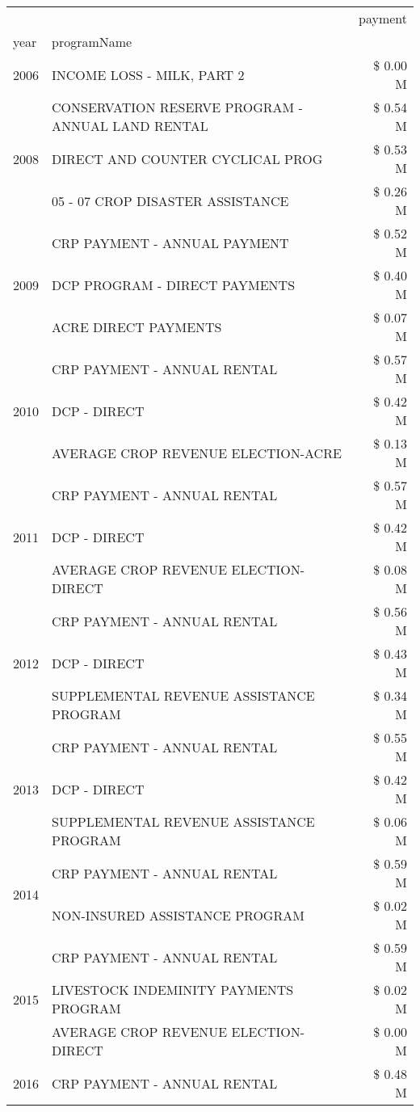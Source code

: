 \begin{tabular}{llr}
\toprule
 &  & payment \\
year & programName &  \\
\midrule
2006 & INCOME LOSS - MILK, PART 2 & \$ 0.00 M \\
\cline{1-3}
\multirow[t]{3}{*}{2008} & CONSERVATION RESERVE PROGRAM - ANNUAL LAND RENTAL & \$ 0.54 M \\
 & DIRECT AND COUNTER CYCLICAL PROG & \$ 0.53 M \\
 & 05 - 07 CROP DISASTER ASSISTANCE & \$ 0.26 M \\
\cline{1-3}
\multirow[t]{3}{*}{2009} & CRP PAYMENT - ANNUAL PAYMENT & \$ 0.52 M \\
 & DCP PROGRAM - DIRECT PAYMENTS & \$ 0.40 M \\
 & ACRE DIRECT PAYMENTS & \$ 0.07 M \\
\cline{1-3}
\multirow[t]{3}{*}{2010} & CRP PAYMENT - ANNUAL RENTAL & \$ 0.57 M \\
 & DCP - DIRECT & \$ 0.42 M \\
 & AVERAGE CROP REVENUE ELECTION-ACRE & \$ 0.13 M \\
\cline{1-3}
\multirow[t]{3}{*}{2011} & CRP PAYMENT - ANNUAL RENTAL & \$ 0.57 M \\
 & DCP - DIRECT & \$ 0.42 M \\
 & AVERAGE CROP REVENUE ELECTION-DIRECT & \$ 0.08 M \\
\cline{1-3}
\multirow[t]{3}{*}{2012} & CRP PAYMENT - ANNUAL RENTAL & \$ 0.56 M \\
 & DCP - DIRECT & \$ 0.43 M \\
 & SUPPLEMENTAL REVENUE ASSISTANCE PROGRAM & \$ 0.34 M \\
\cline{1-3}
\multirow[t]{3}{*}{2013} & CRP PAYMENT - ANNUAL RENTAL & \$ 0.55 M \\
 & DCP - DIRECT & \$ 0.42 M \\
 & SUPPLEMENTAL REVENUE ASSISTANCE PROGRAM & \$ 0.06 M \\
\cline{1-3}
\multirow[t]{2}{*}{2014} & CRP PAYMENT - ANNUAL RENTAL & \$ 0.59 M \\
 & NON-INSURED ASSISTANCE PROGRAM & \$ 0.02 M \\
\cline{1-3}
\multirow[t]{3}{*}{2015} & CRP PAYMENT - ANNUAL RENTAL & \$ 0.59 M \\
 & LIVESTOCK INDEMINITY PAYMENTS PROGRAM & \$ 0.02 M \\
 & AVERAGE CROP REVENUE ELECTION-DIRECT & \$ 0.00 M \\
\cline{1-3}
\multirow[t]{3}{*}{2016} & CRP PAYMENT - ANNUAL RENTAL & \$ 0.48 M \\

\end{tabular}
